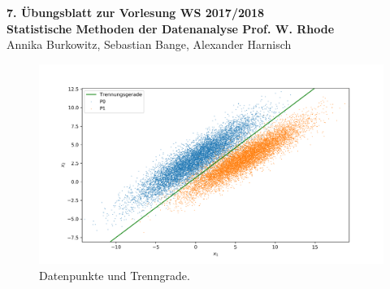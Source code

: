 \documentclass[a4paper, 11pt]{article}
\begin{document}
\noindent
\large{\textbf{7. Übungsblatt zur Vorlesung \hfill WS 2017/2018 \\
Statistische Methoden der Datenanalyse \hfill Prof. W. Rhode}} \\
Annika Burkowitz, Sebastian Bange, Alexander Harnisch \\
\noindent\makebox[\linewidth]{\rule{\textwidth}{0.4pt}}



\begin{figure}
    \centering
    \includegraphics[width=\textwidth]{../A22/A22.png}
    \caption{Datenpunkte und Trenngrade.}
\end{figure}
\end{document}
